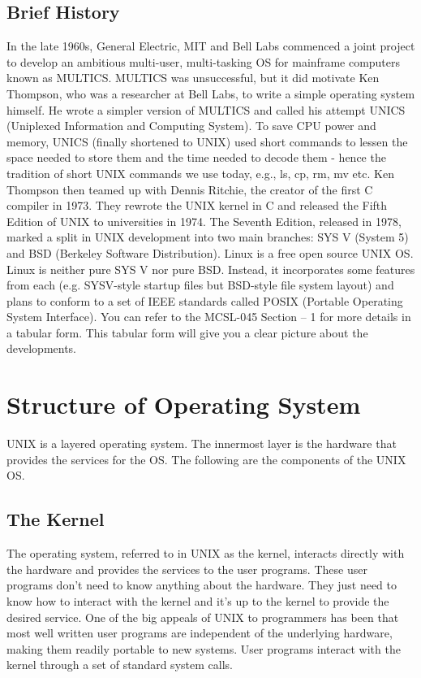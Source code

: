 \documentclass{article}
\begin{document}
\subsection{Brief History}
In the late 1960s, General Electric, MIT and Bell Labs commenced a joint project to
develop an ambitious multi-user, multi-tasking OS for mainframe computers known
as MULTICS. MULTICS was unsuccessful, but it did motivate Ken Thompson, who
was a researcher at Bell Labs, to write a simple operating system himself. He wrote a simpler version of MULTICS and called his attempt UNICS (Uniplexed Information
and Computing System). To save CPU power and memory, UNICS (finally shortened to UNIX) used short commands to lessen the space needed to store them and the time needed to decode them - hence the tradition of short UNIX commands we use today, e.g., ls, cp, rm, mv etc. Ken Thompson then teamed up with Dennis Ritchie, the creator of the first C compiler in 1973. They rewrote the UNIX kernel in C and released the Fifth Edition of UNIX to universities in 1974. The Seventh Edition, released in 1978, marked a split in UNIX development into two main branches: SYS V (System 5) and BSD (Berkeley Software Distribution). Linux is a free open source UNIX OS. Linux is neither pure SYS V nor pure BSD. Instead, it incorporates some features from each (e.g. SYSV-style startup files but BSD-style file system layout) and plans to conform to a set of IEEE standards called POSIX (Portable Operating System Interface). You can refer to the MCSL-045 Section – 1 for more details in a tabular form. This tabular form will give you a clear picture about the developments.



\section{Structure of Operating System}
UNIX is a layered operating system. The innermost layer is the hardware that
provides the services for the OS. The following are the components of the UNIX OS.

\subsection{The Kernel}
The operating system, referred to in UNIX as the kernel, interacts directly with the
hardware and provides the services to the user programs. These user programs don't need to know anything about the hardware. They just need to know how to interact with the kernel and it's up to the kernel to provide the desired service. One of the big appeals of UNIX to programmers has been that most well written user programs are independent of the underlying hardware, making them readily portable to new systems. User programs interact with the kernel through a set of standard system calls. 
\end{document}
